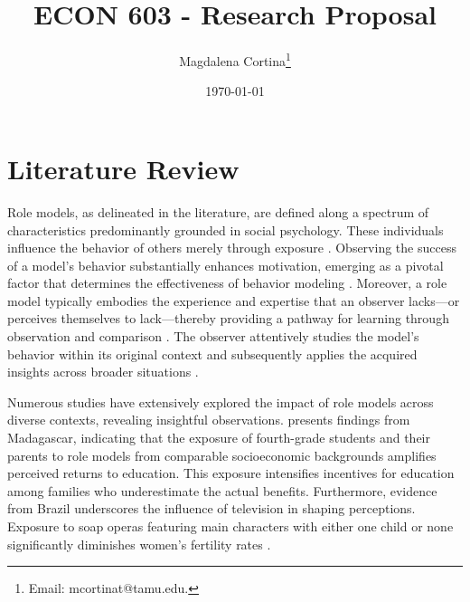 




\title{\Large \textbf{ECON 603 - Research Proposal}}

\author{Magdalena Cortina\thanks{Email: mcortinat@tamu.edu.}} 
\date{\today}

\maketitle
\thispagestyle{empty} 
\doublespacing
\thispagestyle{empty} 

\vspace{-10mm}

\doublespacing

\section{ Literature Review}

Role models, as delineated in the literature, are defined along a spectrum of characteristics predominantly grounded in social psychology. These individuals influence the behavior of others merely through exposure \citep{merton_social_1968}. Observing the success of a model’s behavior substantially enhances motivation, emerging as a pivotal factor that determines the effectiveness of behavior modeling \citep{bandura_social_1977}. Moreover, a role model typically embodies the experience and expertise that an observer lacks—or perceives themselves to lack—thereby providing a pathway for learning through observation and comparison \citep{kemper_reference_1968}. The observer attentively studies the model’s behavior within its original context and subsequently applies the acquired insights across broader situations \citep{brophy_child_1977}.

Numerous studies have extensively explored the impact of role models across diverse contexts, revealing insightful observations. \citet{nguyen_information_nodate} presents findings from Madagascar, indicating that the exposure of fourth-grade students and their parents to role models from comparable socioeconomic backgrounds amplifies perceived returns to education. This exposure intensifies incentives for education among families who underestimate the actual benefits. Furthermore, evidence from Brazil underscores the influence of television in shaping perceptions. Exposure to soap operas featuring main characters with either one child or none significantly diminishes women’s fertility rates \citep{la_ferrara_soap_2012}.

